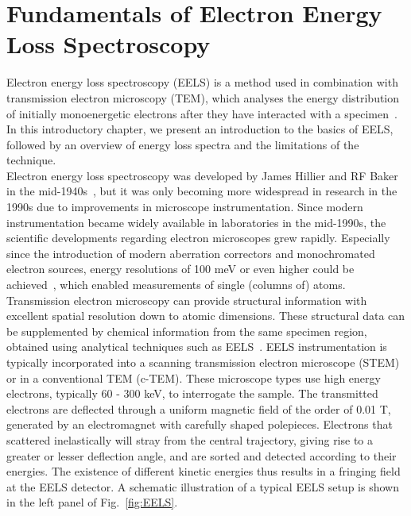 \section{Fundamentals of Electron Energy Loss Spectroscopy}
\label{sec:eels}

Electron energy loss spectroscopy (EELS) is a method used in combination with 
transmission electron microscopy (TEM), which analyses the 
energy distribution of initially monoenergetic electrons after
they have interacted with a specimen~\cite{Egertonbook}. 
%
In this introductory chapter, we present an introduction to the basics
of EELS, followed by an overview of energy loss spectra and 
the limitations of the technique.\\

Electron energy loss spectroscopy was developed by James Hillier and RF Baker in 
the mid-1940s~\cite{Hillier},%
but it was only becoming more widespread in research in the 1990s 
due to improvements in microscope instrumentation. 
%
Since modern instrumentation became widely available in laboratories in the
mid-1990s, the scientific developments regarding electron microscopes grew rapidly.
%
Especially since the introduction of modern aberration correctors
and monochromated electron sources, energy resolutions of 100 meV
or even higher could be achieved~\cite{}, %
which enabled measurements of single (columns of) atoms. 
%
Transmission electron microscopy can provide structural information 
with excellent spatial resolution down to atomic dimensions. 
These structural data can be supplemented by chemical information 
from the same specimen region, obtained using analytical techniques
such as EELS~\cite{Holer}.
%
EELS instrumentation is typically incorporated into a scanning
transmission electron microscope (STEM) or in a conventional TEM (c-TEM).
%
These microscope types use high energy electrons, typically 60 - 300 keV, 
to interrogate the sample. 
%
The transmitted electrons are deflected through a uniform magnetic field 
of the order of 0.01 T, generated by an electromagnet with carefully shaped polepieces. 
%
Electrons that scattered inelastically will stray from the central trajectory, 
giving rise to a greater or lesser deflection angle, 
and are sorted and detected according to their energies. 
%
The existence of different kinetic energies thus results in a fringing 
field at the EELS detector.
%
A schematic illustration of a typical EELS setup is shown in the left panel of Fig.~\ref{fig:EELS}.
%


